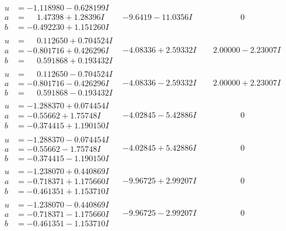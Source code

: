 \documentclass[1p]{elsarticle_modified}
\theoremstyle{definition}
\begin{document}
$$\begin{array}{c|c|c}
\begin{aligned}
u &= -1.118980 - 0.628199 I \\
a &= \phantom{-}1.47398 + 1.28396 I \\
b &= -0.492230 + 1.151260 I\end{aligned}
 & -9.6419 - 11.0356 I & \phantom{-0.000000 } 0 \\ \hline\begin{aligned}
u &= \phantom{-}0.112650 + 0.704524 I \\
a &= -0.801716 + 0.426296 I \\
b &= \phantom{-}0.591868 + 0.193432 I\end{aligned}
 & -4.08336 + 2.59332 I & \phantom{-}2.00000 - 2.23007 I \\ \hline\begin{aligned}
u &= \phantom{-}0.112650 - 0.704524 I \\
a &= -0.801716 - 0.426296 I \\
b &= \phantom{-}0.591868 - 0.193432 I\end{aligned}
 & -4.08336 - 2.59332 I & \phantom{-}2.00000 + 2.23007 I \\ \hline\begin{aligned}
u &= -1.288370 + 0.074454 I \\
a &= -0.55662 + 1.75748 I \\
b &= -0.374415 + 1.190150 I\end{aligned}
 & -4.02845 - 5.42886 I & \phantom{-0.000000 } 0 \\ \hline\begin{aligned}
u &= -1.288370 - 0.074454 I \\
a &= -0.55662 - 1.75748 I \\
b &= -0.374415 - 1.190150 I\end{aligned}
 & -4.02845 + 5.42886 I & \phantom{-0.000000 } 0 \\ \hline\begin{aligned}
u &= -1.238070 + 0.440869 I \\
a &= -0.718371 + 1.175660 I \\
b &= -0.461351 + 1.153710 I\end{aligned}
 & -9.96725 + 2.99207 I & \phantom{-0.000000 } 0 \\ \hline\begin{aligned}
u &= -1.238070 - 0.440869 I \\
a &= -0.718371 - 1.175660 I \\
b &= -0.461351 - 1.153710 I\end{aligned}
 & -9.96725 - 2.99207 I & \phantom{-0.000000 } 0 \\ \hline\begin{aligned}

\end{aligned}
\end{array}$$
\end{document}
